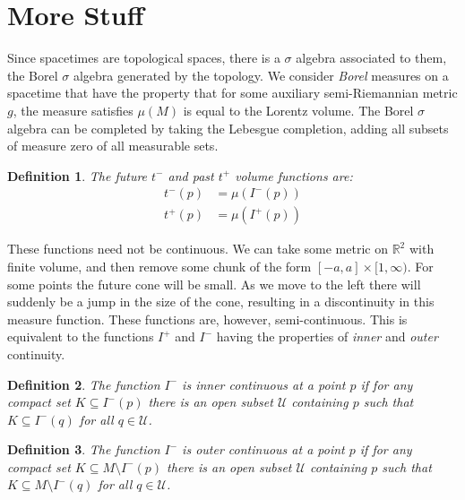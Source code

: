 \documentclass{article}
\theoremstyle{plain}
\theoremstyle{thmit}
\theoremstyle{normal}
\newtheorem{definition}{Definition}[section]
\begin{document}
    \section{More Stuff}
        Since spacetimes are topological spaces, there is a $\sigma$ algebra
        associated to them, the Borel $\sigma$ algebra generated by the
        topology. We consider \textit{Borel} measures on a spacetime that have
        the property that for some auxiliary semi-Riemannian metric $g$, the
        measure satisfies $\mu(M)$ is equal to the Lorentz volume. The Borel
        $\sigma$ algebra can be completed by taking the Lebesgue completion,
        adding all subsets of measure zero of all measurable sets.
        \par\hfill\par
        \begin{definition}
            The future $t^{-}$ and past $t^{+}$ volume functions are:
            \begin{subequations}
                \begin{align}
                    t^{-}(p)&=\mu(I^{-}(p))\\
                    t^{+}(p)&=\mu(I^{+}(p))
                \end{align}
            \end{subequations}
        \end{definition}
        These functions need not be continuous. We can take some metric on
        $\mathbb{R}^{2}$ with finite volume, and then remove some chunk of the
        form $[-a,a]\times[1,\infty)$. For some points the future cone will be
        small. As we move to the left there will suddenly be a jump in the size
        of the cone, resulting in a discontinuity in this measure function.
        These functions are, however, semi-continuous. This is equivalent to the
        functions $I^{+}$ and $I^{-}$ having the properties of \textit{inner}
        and \textit{outer} continuity.
        \begin{definition}
            The function $I^{-}$ is inner continuous at a point $p$ if for
            any compact set $K\subseteq{I}^{-}(p)$ there is an open subset
            $\mathcal{U}$ containing $p$ such that $K\subseteq{I}^{-}(q)$ for
            all $q\in\mathcal{U}$.
        \end{definition}
        \begin{definition}
            The function $I^{-}$ is outer continuous at a point $p$ if for
            any compact set $K\subseteq{M}\setminus{I}^{-}(p)$ there is an open
            subset $\mathcal{U}$ containing $p$ such that
            $K\subseteq{M}\setminus{I}^{-}(q)$ for all $q\in\mathcal{U}$.
        \end{definition}
\end{document}
